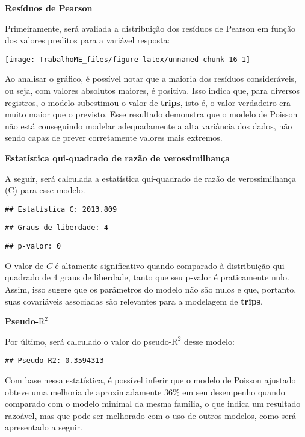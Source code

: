 \documentclass[
]{article}
\begin{document}
\textbf{Resíduos de Pearson}

Primeiramente, será avaliada a distribuição dos resíduos de Pearson em
função dos valores preditos para a variável resposta:

\begin{center}\texttt{[image: TrabalhoME\_files/figure-latex/unnamed-chunk-16-1]} \end{center}

Ao analisar o gráfico, é possível notar que a maioria dos resíduos
consideráveis, ou seja, com valores absolutos maiores, é positiva. Isso
indica que, para diversos registros, o modelo subestimou o valor de
\textbf{trips}, isto é, o valor verdadeiro era muito maior que o
previsto. Esse resultado demonstra que o modelo de Poisson não está
conseguindo modelar adequadamente a alta variância dos dados, não sendo
capaz de prever corretamente valores mais extremos.

\textbf{Estatística qui-quadrado de razão de verossimilhança}

A seguir, será calculada a estatística qui-quadrado de razão de
verossimilhança (C) para esse modelo.

\begin{verbatim}
## Estatística C: 2013.809
\end{verbatim}

\begin{verbatim}
## Graus de liberdade: 4
\end{verbatim}

\begin{verbatim}
## p-valor: 0
\end{verbatim}

O valor de \(C\) é altamente significativo quando comparado à
distribuição qui-quadrado de \(4\) graus de liberdade, tanto que seu
p-valor é praticamente nulo. Assim, isso sugere que os parâmetros do
modelo não são nulos e que, portanto, suas covariáveis associadas são
relevantes para a modelagem de \textbf{trips}.

\textbf{Pseudo-\(\text{R}^2\)}

Por último, será calculado o valor do pseudo-\(\text{R}^2\) desse
modelo:

\begin{verbatim}
## Pseudo-R2: 0.3594313
\end{verbatim}

Com base nessa estatística, é possível inferir que o modelo de Poisson
ajustado obteve uma melhoria de aproximadamente \(36\%\) em seu
desempenho quando comparado com o modelo minimal da mesma família, o que
indica um resultado razoável, mas que pode ser melhorado com o uso de
outros modelos, como será apresentado a seguir.
\end{document}
